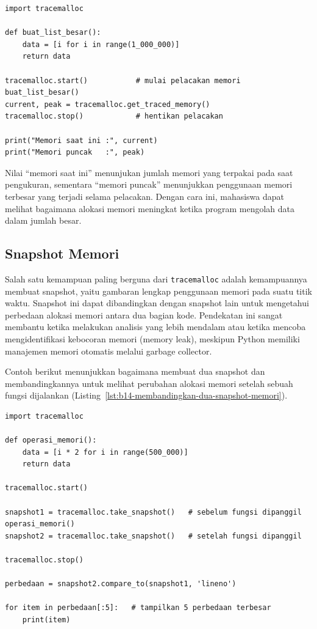 \begin{lstlisting}[style=PythonStyle, caption={Mengukur pemakaian memori dengan tracemalloc}, label={lst:b14-mengukur-pemakaian-memori-dengan-tracemalloc}]
import tracemalloc

def buat_list_besar():
    data = [i for i in range(1_000_000)]
    return data

tracemalloc.start()           # mulai pelacakan memori
buat_list_besar()
current, peak = tracemalloc.get_traced_memory()
tracemalloc.stop()            # hentikan pelacakan

print("Memori saat ini :", current)
print("Memori puncak   :", peak)
\end{lstlisting}

Nilai “memori saat ini” menunjukan jumlah memori yang terpakai pada saat pengukuran, sementara “memori puncak” menunjukkan penggunaan memori terbesar yang terjadi selama pelacakan. Dengan cara ini, mahasiswa dapat melihat bagaimana alokasi memori meningkat ketika program mengolah data dalam jumlah besar.

\subsection{Snapshot Memori}

Salah satu kemampuan paling berguna dari \texttt{tracemalloc} adalah kemampuannya membuat snapshot, yaitu gambaran lengkap penggunaan memori pada suatu titik waktu. Snapshot ini dapat dibandingkan dengan snapshot lain untuk mengetahui perbedaan alokasi memori antara dua bagian kode. Pendekatan ini sangat membantu ketika melakukan analisis yang lebih mendalam atau ketika mencoba mengidentifikasi kebocoran memori (memory leak), meskipun Python memiliki manajemen memori otomatis melalui garbage collector.

Contoh berikut menunjukkan bagaimana membuat dua snapshot dan membandingkannya untuk melihat perubahan alokasi memori setelah sebuah fungsi dijalankan (Listing~\ref{lst:b14-membandingkan-dua-snapshot-memori}).

\begin{lstlisting}[style=PythonStyle, caption={Membandingkan dua snapshot memori}, label={lst:b14-membandingkan-dua-snapshot-memori}]
import tracemalloc

def operasi_memori():
    data = [i * 2 for i in range(500_000)]
    return data

tracemalloc.start()

snapshot1 = tracemalloc.take_snapshot()   # sebelum fungsi dipanggil
operasi_memori()
snapshot2 = tracemalloc.take_snapshot()   # setelah fungsi dipanggil

tracemalloc.stop()

perbedaan = snapshot2.compare_to(snapshot1, 'lineno')

for item in perbedaan[:5]:   # tampilkan 5 perbedaan terbesar
    print(item)
\end{lstlisting}


